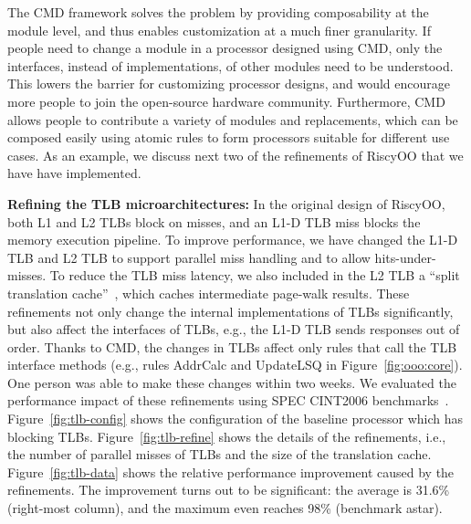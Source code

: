 \documentclass[conference]{IEEEtran}
\begin{document}
The CMD framework solves the problem by providing composability at the module level, and thus enables customization at a much finer granularity.
If people need to change a module in a processor designed using CMD, only the interfaces, instead of implementations, of other modules need to be understood.
This lowers the barrier for customizing processor designs, and would encourage more people to join the open-source hardware community.
Furthermore, CMD allows people to contribute a variety of modules and replacements, which can be composed easily using atomic rules to form processors suitable for different use cases.
As an example, we discuss next two of the refinements of RiscyOO that we have have implemented. 

\noindent\textbf{Refining the TLB microarchitectures:}
In the original design of RiscyOO, both L1 and L2 TLBs block on misses, and an L1-D TLB miss blocks the memory execution pipeline.
To improve performance, we have changed the L1-D TLB and L2 TLB to support parallel miss handling and to allow hits-under-misses.
To reduce the TLB miss latency, we also included in the L2 TLB a ``split translation cache''~\cite{translationCache}, which caches intermediate page-walk results.
These refinements not only change the internal implementations of TLBs significantly, but also affect the interfaces of TLBs, e.g., the L1-D TLB sends responses out of order.
Thanks to CMD, the changes in TLBs affect only rules that call the TLB interface methods (e.g., rules AddrCalc and UpdateLSQ in Figure~\ref{fig:ooo:core}). One person was able to make these  changes within two weeks.
We evaluated the performance impact of these refinements using SPEC CINT2006 benchmarks~\cite{riscyoo}.
Figure~\ref{fig:tlb-config} shows the configuration of the baseline processor which has blocking TLBs.
Figure~\ref{fig:tlb-refine} shows the details of the refinements, i.e., the number of parallel misses of TLBs and the size of the translation cache.
Figure~\ref{fig:tlb-data} shows the relative performance improvement caused by the refinements.
The improvement turns out to be significant: the average is 31.6\% (right-most column), and the maximum even reaches 98\% (benchmark astar).

\end{document}
